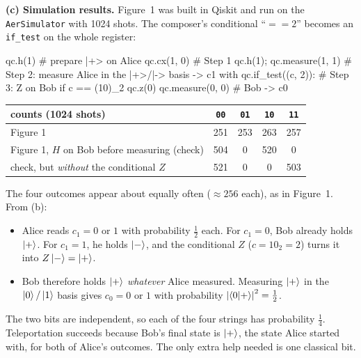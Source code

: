 \documentclass[a4paper, 10pt]{article}
\begin{document}
\begin{solution}
	\noindent \textbf{(c) Simulation results.} Figure~1 was built in Qiskit and run on the \texttt{AerSimulator} with 1024 shots. The composer's conditional ``\( == 2 \)'' becomes an \texttt{if\_test} on the whole register:
	\begin{codingbox*}
qc.h(1)                       # prepare |+> on Alice
qc.cx(1, 0)                   # Step 1
qc.h(1); qc.measure(1, 1)     # Step 2: measure Alice in the |+>/|-> basis -> c1
with qc.if_test((c, 2)):      # Step 3: Z on Bob if c == (10)_2
    qc.z(0)
qc.measure(0, 0)              # Bob -> c0
\end{codingbox*}
	\begin{center}
		\begin{tabular}{lcccc}
			\toprule
			counts (1024 shots)                               & \texttt{00} & \texttt{01} & \texttt{10} & \texttt{11} \\
			\midrule
			Figure 1                                          & 251         & 253         & 263         & 257         \\
			Figure 1, \( H \) on Bob before measuring (check) & 504         & 0           & 520         & 0           \\
			check, but \emph{without} the conditional \( Z \) & 521         & 0           & 0           & 503         \\
			\bottomrule
		\end{tabular}
	\end{center}
	\noindent The four outcomes appear about equally often (\( \approx 256 \) each), as in Figure~1. From (b):
	\begin{itemize}
		\item Alice reads \( c_1 = 0 \) or \( 1 \) with probability \( \tfrac{1}{2} \) each. For \( c_1 = 0 \), Bob already holds \( \ket{+} \). For \( c_1 = 1 \), he holds \( \ket{-} \), and the conditional \( Z \) (\( c = 10_2 = 2 \)) turns it into \( Z\ket{-} = \ket{+} \).
		\item Bob therefore holds \( \ket{+} \) \emph{whatever} Alice measured. Measuring \( \ket{+} \) in the \( \ket{0}/\ket{1} \) basis gives \( c_0 = 0 \) or \( 1 \) with probability \( \left|\braket{0 \vert +}\right|^2 = \tfrac{1}{2} \).
	\end{itemize}
	The two bits are independent, so each of the four strings has probability \( \tfrac{1}{4} \). Teleportation succeeds because Bob's final state is \( \ket{+} \), the state Alice started with, for both of Alice's outcomes. The only extra help needed is one classical bit.


\end{solution}
\end{document}

